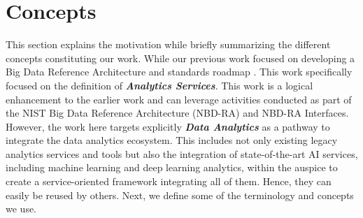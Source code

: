

\section{Concepts}\label{s:background}

This section explains the motivation while briefly summarizing the different concepts constituting our work. While our previous work
focused on developing a Big Data Reference Architecture and standards
roadmap \cite{nist-v8}. This work specifically focused on the
definition of {\bf\em Analytics Services}. This work is a logical
enhancement to the earlier work and can leverage activities conducted
as part of the NIST Big Data Reference Architecture (NBD-RA) and
NBD-RA Interfaces. However, the work here targets explicitly {\bf\em
Data Analytics} as a pathway to integrate the data analytics
ecosystem. This includes not only existing legacy analytics
services and tools but also the integration of state-of-the-art AI
services, including machine learning and deep learning analytics, within
the auspice to create a service-oriented framework integrating all of
them. Hence, they can easily be reused by others. Next, we define some
of the terminology and concepts we use.


